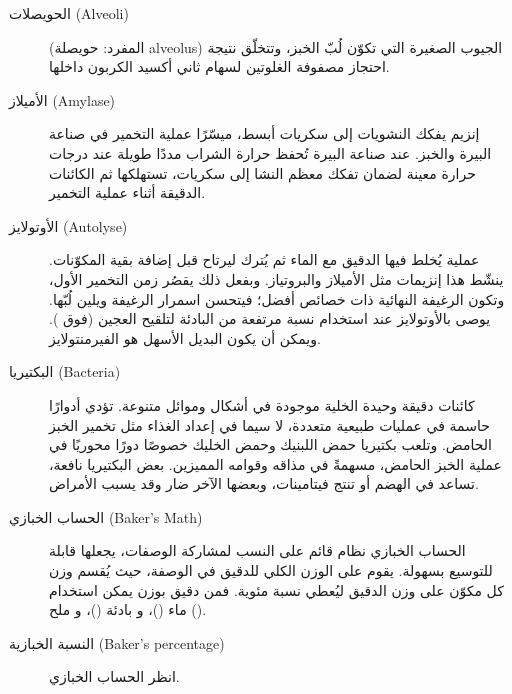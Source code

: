 \begin{description}
\item[الحويصلات \textenglish{(Alveoli)}]
(المفرد: حويصلة \textenglish{alveolus}) الجيوب الصغيرة التي تكوّن لُبّ الخبز، وتتخلّق نتيجة احتجاز مصفوفة الغلوتين لسهام ثاني أكسيد الكربون داخلها.

\item[الأميلاز \textenglish{(Amylase)}]
إنزيم يفكك النشويات إلى سكريات أبسط، ميسّرًا عملية التخمير في صناعة البيرة والخبز. عند صناعة البيرة تُحفظ حرارة الشراب مددًا طويلة عند درجات حرارة معينة لضمان تفكك معظم النشا إلى سكريات، تستهلكها ثم الكائنات الدقيقة أثناء عملية التخمير.

\item[الأوتولايز \textenglish{(Autolyse)}]
عملية يُخلط فيها الدقيق مع الماء ثم يُترك ليرتاح قبل إضافة بقية المكوّنات. ينشّط هذا إنزيمات مثل الأميلاز والبروتياز. وبفعل ذلك يقصُر زمن التخمير الأول، وتكون الرغيفة النهائية ذات خصائص أفضل؛ فيتحسن اسمرار الرغيفة ويلين لُبّها. يوصى بالأوتولايز عند استخدام نسبة مرتفعة من البادئة لتلقيح العجين (فوق ). ويمكن أن يكون البديل الأسهل هو الفيرمنتولايز.

\item[البكتيريا \textenglish{(Bacteria)}]
كائنات دقيقة وحيدة الخلية موجودة في أشكال وموائل متنوعة. تؤدي أدوارًا حاسمة في عمليات طبيعية متعددة، لا سيما في إعداد الغذاء مثل تخمير الخبز الحامض. وتلعب بكتيريا حمض اللبنيك وحمض الخليك خصوصًا دورًا محوريًا في عملية الخبز الحامض، مسهمةً في مذاقه وقوامه المميزين. بعض البكتيريا نافعة، تساعد في الهضم أو تنتج فيتامينات، وبعضها الآخر ضار وقد يسبب الأمراض.

\item[الحساب الخبازي \textenglish{(Baker's Math)}]
الحساب الخبازي نظام قائم على النسب لمشاركة الوصفات، يجعلها قابلة للتوسيع بسهولة. يقوم على الوزن الكلي للدقيق في الوصفة، حيث يُقسم وزن كل مكوّن على وزن الدقيق ليُعطي نسبة مئوية. فمن دقيق بوزن  يمكن استخدام  ماء ()، و بادئة ()، و ملح ().

\item[النسبة الخبازية \textenglish{(Baker's percentage)}]
انظر الحساب الخبازي.


\end{description}
